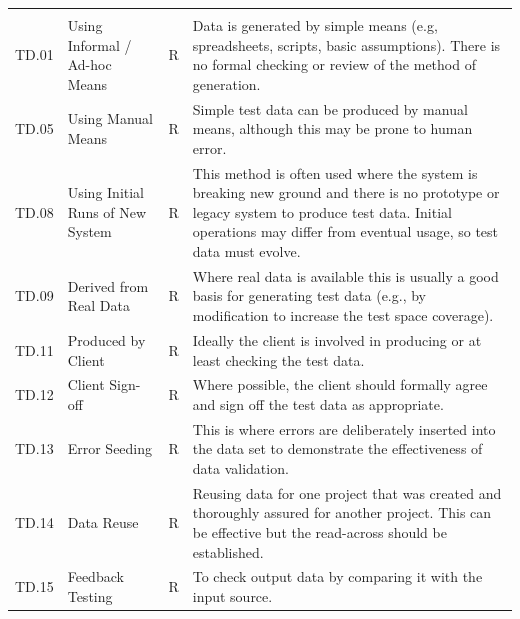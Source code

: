 \begin{longtable*}{|C{}|L{}|C{}|L{}|}
  \hline{} &  &  & \\\hline
  \endfirsthead
  \hline{} &  &  & \\\hline
  \endhead
  \endfoot\endlastfoot
   TD.01 & Using Informal / Ad-hoc Means & R & Data is generated by simple means (e.g, spreadsheets, scripts, basic assumptions). There is no formal checking or review of the method of generation.\\
  \hline
   TD.05 & Using Manual Means & R & Simple test data can be produced by manual means, although this may be prone to human error.\\
  \hline
   TD.08 & Using Initial Runs of New System & R & This method is often used where the system is breaking new ground and there is no prototype or legacy system to produce test data. Initial operations may differ from eventual usage, so test data must evolve.\\
  \hline
   TD.09 & Derived from Real Data & R & Where real data is available this is usually a good basis for generating test data (e.g., by modification to increase the test space coverage).\\
  \hline
   TD.11 & Produced by Client & R & Ideally the client is involved in producing or at least checking the test data.\\
  \hline
   TD.12 & Client Sign-off & R & Where possible, the client should formally agree and sign off the test data as appropriate.\\
  \hline
   TD.13 & Error Seeding & R & This is where errors are deliberately inserted into the data set to demonstrate the effectiveness of data validation.\\
  \hline
   TD.14 & Data Reuse & R & Reusing data for one project that was created and thoroughly assured for another project. This can be effective but the read-across should be established.\\
  \hline
   TD.15 & Feedback Testing & R & To check output data by comparing it with the input source.\\
  \hline
\end{longtable*}

